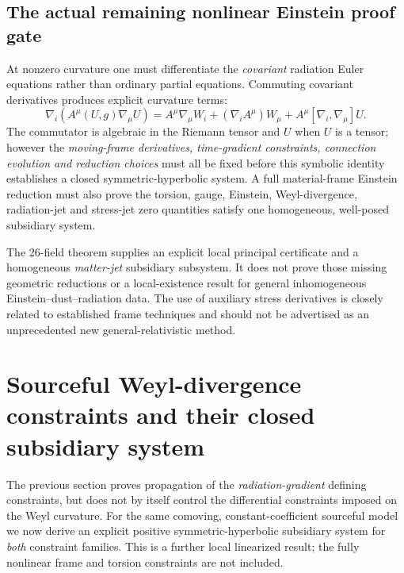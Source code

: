 \documentclass[11pt,a4paper]{article}
\begin{document}
\subsection{The actual remaining nonlinear Einstein proof gate}
At nonzero curvature one must
differentiate the \emph{covariant}
radiation Euler equations rather
than ordinary partial equations.
Commuting covariant derivatives
produces explicit curvature terms:
\begin{equation}\label{eq:covprolong}
\nabla_i(A^\mu(U,g)\nabla_\mu U)
=A^\mu\nabla_\mu W_i
+(\nabla_i A^\mu)W_\mu
+A^\mu[\nabla_i,\nabla_\mu]U .
\end{equation}
The commutator is algebraic
in the Riemann tensor and
$U$ when $U$ is a tensor;
however the \emph{moving-frame
derivatives, time-gradient
constraints, connection evolution
and reduction choices} must all
be fixed before this symbolic
identity establishes a closed
symmetric-hyperbolic system.
A full material-frame
Einstein reduction must also
prove the torsion, gauge,
Einstein, Weyl-divergence,
radiation-jet and stress-jet
zero quantities satisfy one
homogeneous, well-posed
subsidiary system.

The 26-field theorem
supplies an explicit local
principal certificate and
a homogeneous \emph{matter-jet}
subsidiary subsystem.
It does not prove those
missing geometric reductions
or a local-existence result
for general inhomogeneous
Einstein--dust--radiation data.
The use of auxiliary
stress derivatives is closely
related to established frame
techniques \cite{friedrich,normann}
and should not be advertised
as an unprecedented new
general-relativistic method.


\section{Sourceful Weyl-divergence constraints and their closed subsidiary system}
\label{sec:weyl-subsidiary}
The previous section proves propagation of the
\emph{radiation-gradient} defining constraints,
but does not by itself control the differential
constraints imposed on the Weyl curvature.
For the same comoving, constant-coefficient
sourceful model we now derive an explicit
positive symmetric-hyperbolic subsidiary
system for \emph{both} constraint families.
This is a further local linearized result;
the fully nonlinear frame and torsion
constraints are not included.
\end{document}
